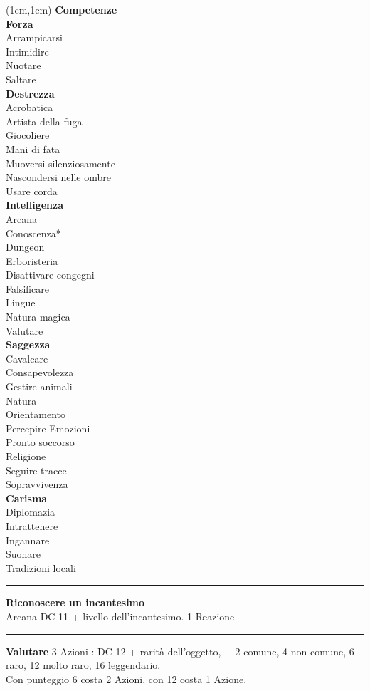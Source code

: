 \documentclass[a4paper,12 pt,openany]{book}
\newcommand{\riga}{\rule{\textwidth}{0.4pt}}
\begin{document}
\begin{textblock*}{4cm}(1cm,1cm) %
{\textbf{Competenze}\\
\textbf{Forza}\\
Arrampicarsi\\
Intimidire\\
Nuotare\\
Saltare	\\
\textbf{Destrezza}\\
Acrobatica\\
Artista della fuga\\
Giocoliere\\
Mani di fata\\
Muoversi silenziosamente\\
Nascondersi nelle ombre\\
Usare corda	\\
\textbf{Intelligenza}\\
Arcana\\
Conoscenza*\\
Dungeon\\
Erboristeria\\
Disattivare congegni\\
Falsificare\\
Lingue\\
Natura magica\\
Valutare\\
\textbf{Saggezza}\\
Cavalcare\\
Consapevolezza\\
Gestire animali\\
Natura\\
Orientamento\\
Percepire Emozioni\\
Pronto soccorso\\
Religione\\
Seguire tracce\\
Sopravvivenza\\
\textbf{Carisma}\\
Diplomazia\\
Intrattenere\\
Ingannare\\
Suonare\\
Tradizioni locali
}

\riga

\textbf{Riconoscere un incantesimo}\\ Arcana DC 11 + livello dell'incantesimo. 1 Reazione

\riga

\textbf{Valutare} 3 Azioni : DC 12 + rarità dell'oggetto, + 2 comune, 4 non comune, 6 raro, 12 molto raro, 16 leggendario. \\
Con punteggio 6 costa 2 Azioni, con 12 costa 1 Azione.

\end{textblock*}
\end{document}
